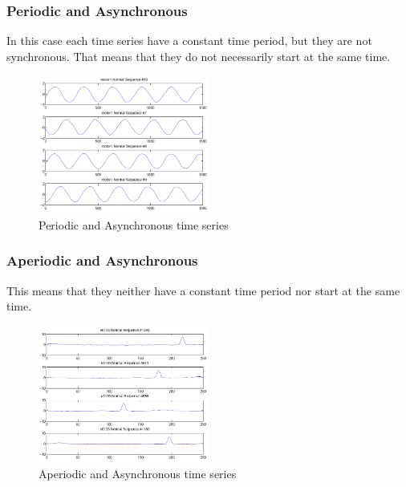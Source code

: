\documentclass[english, a4paper]{report}
\begin{document}
{{{            \subsubsection{Periodic and Asynchronous}
            {
                In this case each time series have a constant time period, but they are not synchronous. That means that they do not necessarily start at the same time.
                
                \begin{figure}[H]
                    \centering \includegraphics[width=0.5\textwidth]{periodicAsynchronous}
                    \caption{Periodic and Asynchronous time series \cite{anomalyDetectionOfTimeSeries}}
                    \label{fig:periodicAsynchronous}
                \end{figure}
            }
            
            \subsubsection{Aperiodic and Asynchronous}
            {
                This means that they neither have a constant time period nor start at the same time.
                
                \begin{figure}[H]
                    \centering \includegraphics[width=0.5\textwidth]{aperiodicAsynchronous}
                    \caption{Aperiodic and Asynchronous time series \cite{anomalyDetectionOfTimeSeries}}
                    \label{fig:aperiodicAsynchronous}
                \end{figure}
            }
        }
    }
    
}
\end{document}
